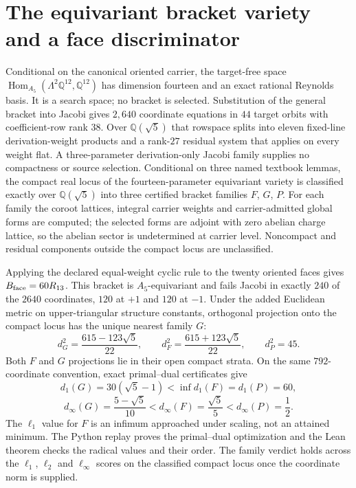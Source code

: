 \documentclass[11pt]{article}
\begin{document}
\section{The equivariant bracket variety and a face discriminator}
\label{sec:brackets}

Conditional on the canonical oriented carrier, the target-free space
\(\operatorname{Hom}_{A_5}(\Lambda^2\mathbb Q^{12},\mathbb Q^{12})\) has
dimension fourteen and an exact rational Reynolds basis. It is a search space;
no bracket is selected. Substitution of the general bracket into Jacobi gives
\(2{,}640\) coordinate equations in \(44\) target orbits with coefficient-row
rank \(38\). Over \(\mathbb Q(\sqrt5)\) that rowspace splits into eleven
fixed-line derivation-weight products and a rank-\(27\) residual system that
applies on every weight flat. A three-parameter derivation-only Jacobi family
supplies no compactness or source selection. Conditional on three named
textbook lemmas, the compact real locus of the fourteen-parameter equivariant
variety is classified exactly over \(\mathbb Q(\sqrt5)\) into three certified
bracket families \(F\), \(G\), \(P\). For each family the coroot lattices,
integral carrier weights and carrier-admitted global forms are computed; the
selected forms are adjoint with zero abelian charge lattice, so the abelian
sector is undetermined at carrier level. Noncompact and residual components
outside the compact locus are unclassified.

Applying the declared equal-weight cyclic rule to the twenty oriented faces
gives \(B_{\rm face}=60R_{13}\). This bracket is \(A_5\)-equivariant and
fails Jacobi in exactly \(240\) of the \(2640\) coordinates, \(120\) at \(+1\)
and \(120\) at \(-1\). Under the added Euclidean metric on upper-triangular
structure constants, orthogonal projection onto the compact locus has the
unique nearest family \(G\):
\[
 d_G^2=\frac{615-123\sqrt5}{22},\qquad
 d_F^2=\frac{615+123\sqrt5}{22},\qquad d_P^2=45 .
\]
Both \(F\) and \(G\) projections lie in their open compact strata. On the same
\(792\)-coordinate convention, exact primal--dual certificates give
\[
 d_1(G)=30(\sqrt5-1)<\inf d_1(F)=d_1(P)=60,
\]
\[
 d_\infty(G)=\frac{5-\sqrt5}{10}
   <d_\infty(F)=\frac{\sqrt5}{5}
   <d_\infty(P)=\frac12.
\]
The \(\ell_1\) value for \(F\) is an infimum approached under scaling, not an
attained minimum. The Python replay proves the primal--dual optimization and
the Lean theorem checks the radical values and their order. The family
verdict holds across the \(\ell_1\), \(\ell_2\) and \(\ell_\infty\) scores on the
classified compact locus once the coordinate norm is supplied.
\end{document}
